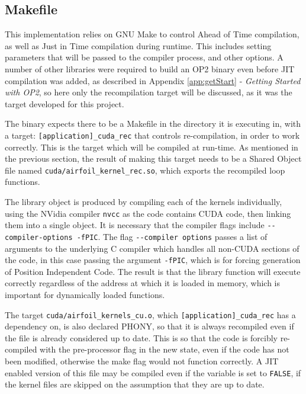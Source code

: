\subsection{Makefile}
\label{ss:make}
This implementation relies on GNU Make to control Ahead of Time compilation, as well as Just in Time compilation during runtime. This includes setting parameters that will be passed to the compiler process, and other options. A number of other libraries were required to build an OP2 binary even before JIT compilation was added, as described in Appendix \ref{app:getStart} - \textit{Getting Started with OP2}, so here only the recompilation target will be discussed, as it was the target developed for this project.
\par
The binary expects there to be a Makefile in the directory it is executing in, with a target: \verb|[application]_cuda_rec| that controls re-compilation, in order to work correctly. This is the target which will be compiled at run-time. As mentioned in the previous section, the result of making this target needs to be a Shared Object file named \verb|cuda/airfoil_kernel_rec.so|, which exports the recompiled loop functions.
\par
The library object is produced by compiling each of the kernels individually, using the NVidia compiler \verb|nvcc| as the code contains CUDA code, then linking them into a single object. It is necessary that the compiler flags include \verb|--compiler-options -fPIC|. The flag \verb|--compiler options| passes a list of arguments to the underlying C compiler which handles all non-CUDA sections of the code, in this case passing the argument \verb|-fPIC|, which is for forcing generation of Position Independent Code. The result is that the library function will execute correctly regardless of the address at which it is loaded in memory, which is important for dynamically loaded functions.
\par
The target \verb|cuda/airfoil_kernels_cu.o|, which \verb|[application]_cuda_rec| has a dependency on, is also declared PHONY, so that it is always recompiled even if the file is already considered up to date. This is so that the code is forcibly re-compiled with the pre-processor flag in the new state, even if the code has not been modified, otherwise the make flag would not function correctly. A JIT enabled version of this file may be compiled even if the variable is set to \verb|FALSE|, if the kernel files are skipped on the assumption that they are up to date.
